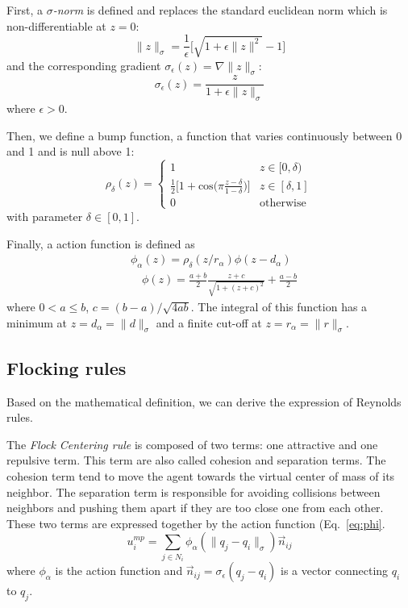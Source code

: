 First, a $\sigma$\emph{-norm} is defined and replaces the standard euclidean norm which is non-differentiable at $z=0$:
\begin{equation}
\|z\|_{\sigma}=\frac{1}{\epsilon}\big[\sqrt{1+\epsilon\|z\|^2}-1\big]
\label{eq:sigmanorm}
\end{equation}
and the corresponding gradient $\sigma_{\epsilon}(z)=\nabla\|z\|_{\sigma}$:
\begin{equation}
\sigma_{\epsilon}(z)=\frac{z}{1+\epsilon\|z\|_{\sigma}}
\label{eq:sigmagrad}
\end{equation}
where $\epsilon>0$. 

Then, we define a bump function, a function that varies continuously between 0 and 1 and is null above 1:
\begin{equation}
\rho_{\delta}(z)=
\left\lbrace
\begin{array}{lll}
1 & z\in[0,\delta)\\
\frac{1}{2}\Big[1+\text{cos}\big(\pi\frac{z-\delta}{1-\delta}\big)\Big] & z\in[\delta,1]\\
0 & \mbox{otherwise}
\end{array}\right.
\label{eq:bump}
\end{equation}
with parameter $\delta\in[0,1]$.

Finally, a action function is defined as 
\begin{align}
&\phi_{\alpha}(z)=\rho_{\delta}(z/r_{\alpha})\phi(z-d_{\alpha}) \nonumber \\
&\quad\phi(z)=\frac{a+b}{2}\frac{z+c}{\sqrt{1+(z+c)^2}}+\frac{a-b}{2}
\label{eq:phi}
\end{align}
where $0<a\le b$, $c=(b-a)/\sqrt{4ab}$. The integral of this function has a minimum at $z=d_{\alpha}=\|d\|_{\sigma}$ and a finite cut-off at $z=r_{\alpha}=\|r\|_{\sigma}$. 

\subsection{Flocking rules}

Based on the mathematical definition, we can derive the expression of Reynolds rules. 

The \emph{Flock Centering rule} is composed of two terms: one attractive and one repulsive term. This term are also called cohesion and separation terms. The cohesion term tend to move the agent towards the virtual center of mass of its neighbor. The separation term is responsible for avoiding collisions between neighbors and pushing them apart if they are too close one from each other.  These two terms are expressed together by the action function (Eq.~\ref{eq:phi}.
\begin{equation}
u_i^{mp}=\sum_{j\in N_i}{\phi_{\alpha}(\|q_j-q_i\|_{\sigma})}\vec{n}_{ij}
\label{eq:motionplanning}
\end{equation}
where $\phi_{\alpha}$ is the action function and $\vec{n}_{ij}=\sigma_{\epsilon}(q_j-q_i)$ is a vector connecting $q_i$ to $q_j$. 

